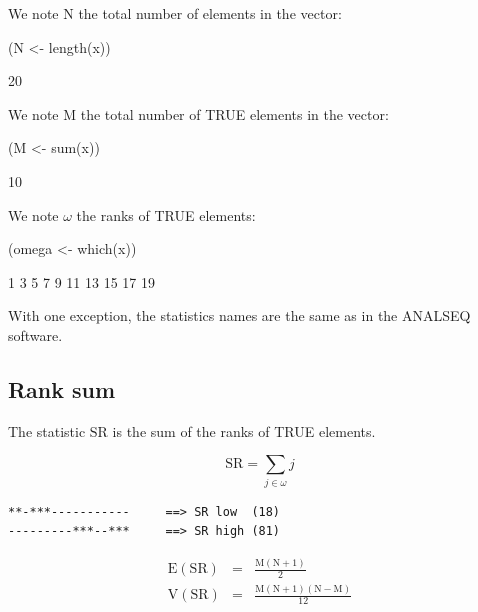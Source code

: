 \documentclass{article}
\begin{document}
We note $\mathrm{N}$ the total number of elements in the vector:

\begin{Schunk}
\begin{Sinput}
 (N <- length(x))
\end{Sinput}
\begin{Soutput}
[1] 20
\end{Soutput}
\end{Schunk}

We note $\mathrm{M}$ the total number of TRUE elements in the vector:

\begin{Schunk}
\begin{Sinput}
 (M <- sum(x))
\end{Sinput}
\begin{Soutput}
[1] 10
\end{Soutput}
\end{Schunk}

We note $\omega$ the ranks of TRUE elements:

\begin{Schunk}
\begin{Sinput}
 (omega <- which(x))
\end{Sinput}
\begin{Soutput}
 [1]  1  3  5  7  9 11 13 15 17 19
\end{Soutput}
\end{Schunk}

With one exception, the statistics names are the same as in the ANALSEQ software.

\subsection{Rank sum}

The statistic $\mathrm{SR}$ is the sum of the ranks of TRUE elements.

$$
\mathrm{SR} = \sum_{j \in \omega}{j}
$$

\begin{verbatim}
**-***-----------     ==> SR low  (18)
---------***--***     ==> SR high (81)
\end{verbatim}

\begin{eqnarray*}
\mathrm{E(SR)} & = & \mathrm{\frac{M(N + 1)}{2}} \\
\mathrm{V(SR)} & = & \mathrm{\frac{M(N + 1)(N - M)}{12}}
\end{eqnarray*}
\end{document}
